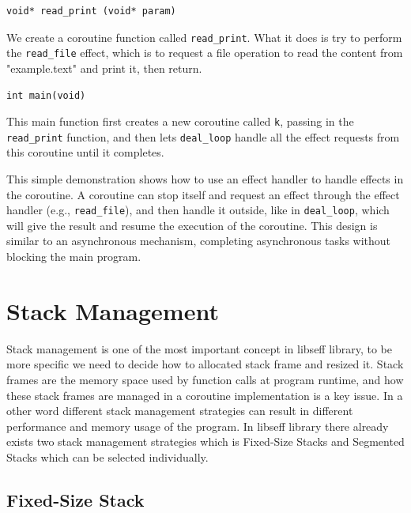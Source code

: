 \documentclass[logo,bsc,singlespacing,parskip]{infthesis}
\begin{document}
\begin{lstlisting}
void* read_print (void* param)
\end{lstlisting}

We create a coroutine function called \texttt{read\_print}. What it does is try to perform the \texttt{read\_file} effect, which is to request a file operation to read the content from "example.text" and print it, then return.

\begin{lstlisting}
int main(void)
\end{lstlisting}

This main function first creates a new coroutine called \texttt{k}, passing in the \texttt{read\_print} function, and then lets \texttt{deal\_loop} handle all the effect requests from this coroutine until it completes.

\medskip




This simple demonstration shows how to use an effect handler to handle effects in the coroutine. A coroutine can stop itself and request an effect through the effect handler (e.g., \texttt{read\_file}), and then handle it outside, like in \texttt{deal\_loop}, which will give the result and resume the execution of the coroutine. This design is similar to an asynchronous mechanism, completing asynchronous tasks without blocking the main program.

\medskip
\medskip

\section{Stack Management}

Stack management is one of the most important concept in libseff  library, to be more specific we need to decide how to allocated stack frame and resized it. Stack frames are the memory space used by function calls at program runtime, and how these stack frames are managed in a coroutine implementation is a key issue. In a other word different stack management strategies can result in different performance and memory usage of the program. In libseff library there already exists two stack management strategies which is Fixed-Size Stacks and Segmented Stacks which can be selected individually.



\medskip

\subsection{Fixed-Size Stack}
\end{document}
